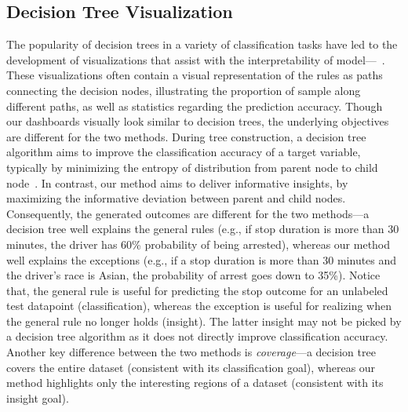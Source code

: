 \subsection{Decision Tree Visualization}
The popularity of decision trees in a variety of classification tasks have led to the development of visualizations that assist with the interpretability of model---~\cite{Ankerst1999,Hermann2017,Terence2018}. These visualizations often contain a visual representation of the rules as paths connecting the decision nodes, illustrating the proportion of sample along different paths, as well as statistics regarding the prediction accuracy. Though our dashboards visually look similar to decision trees, the underlying objectives are different for the two methods. During tree construction, a decision tree algorithm aims to improve the classification accuracy of a target variable, typically by minimizing the entropy of distribution from parent node to child node~\cite{Quinlan1986}. In contrast, our method aims to deliver informative insights, by maximizing the informative deviation between parent and child nodes. Consequently, the generated outcomes are different for the two methods---a decision tree well explains the general rules (e.g., if stop duration is more than 30 minutes, the driver has 60\% probability of being arrested), whereas our method well explains the exceptions (e.g., if a stop duration is more than 30 minutes and the driver's race is Asian, the probability of arrest goes down to 35\%). Notice that, the general rule is useful for predicting the stop outcome for an unlabeled test datapoint (classification), whereas the exception is useful for realizing when the general rule no longer holds (insight). The latter insight may not be picked by a decision tree algorithm as it does not directly improve classification accuracy. Another key difference between the two methods is \emph{coverage}---a decision tree covers the entire dataset (consistent with its classification goal), whereas our method highlights only the interesting regions of a dataset (consistent with its insight goal).


